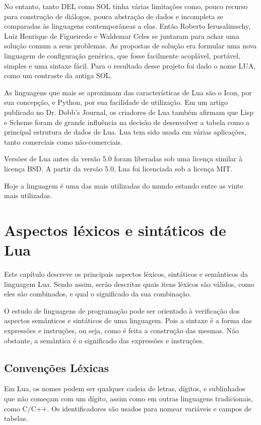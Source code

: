 \documentclass[
12pt, %
openright, %
oneside, %
a4paper, %
english, %
brazil, %
]{abntex2}
\begin{document}
No entanto, tanto DEL como SOL tinha várias limitações como, pouco recurso para construção de diálogos, pouca abstração de dados e incompleta se comparadas às linguagens contemporâneas a elas. Então Roberto Ierusalimschy, Luiz Henrique de Figueiredo e Waldemar Celes se juntaram para achar uma solução comum a seus problemas. As propostas de solução era formular uma nova linguagem de configuração genérica, que fosse facilmente acoplável, portável, simples e uma sintaxe fácil. Para o resultado desse projeto foi dado o nome LUA, como um contraste da antiga SOL.

As linguagens que mais se aproximam das características de Lua são o Icon, por sua concepção, e Python, por sua facilidade de utilização. Em um artigo publicado no Dr. Dobb's Journal, os criadores de Lua também afirmam que Lisp e Scheme foram de grande influência na decisão de desenvolver a tabela como a principal estrutura de dados de Lua. Lua tem sido usada em várias aplicações, tanto comerciais como não-comerciais.

Versões de Lua antes da versão 5.0 foram liberadas sob uma licença similar à licença BSD. A partir da versão 5.0, Lua foi licenciada sob a licença MIT.

Hoje a linguagem é uma das mais utilizadas do mundo estando entre as vinte mais utilizadas.

\chapter{Aspectos léxicos e sintáticos de Lua}
Este capítulo descreve os principais aspectos léxicos, sintáticos e semânticos da linguagem Lua. Sendo assim, serão descritas quais itens léxicos são válidos, como eles são combinados, e qual o significado da sua combinação.

O estudo de linguagens de programação pode ser orientado à verificação dos aspectos semânticos e sintáticos de uma linguagem. Pois a sintaxe é a forma das expressões e instruções, ou seja, como é feita a construção das mesmas. Não obstante, a semântica é o significado das expressões e instruções.

\section{Convenções Léxicas}
Em Lua, os nomes podem ser qualquer cadeia de letras, dígitos, e sublinhados que não começam com um dígito, assim como em outras linguagens tradicionais, como C/C++. Os identificadores são usados para nomear variáveis e campos de tabelas.
\end{document}
